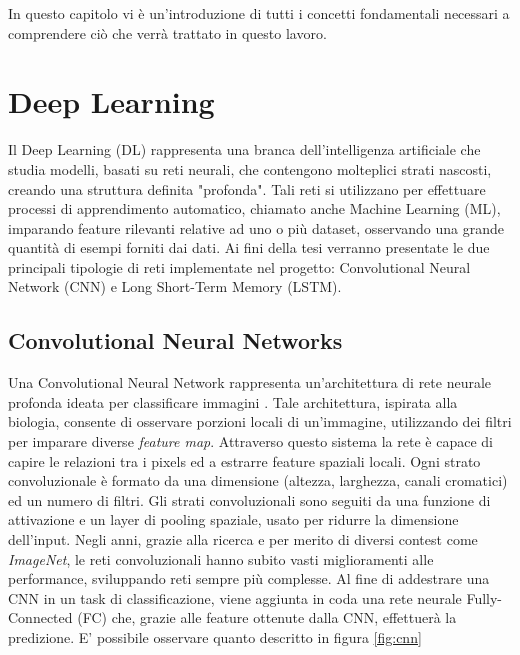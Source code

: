 \documentclass[11pt]{report}
\begin{document}
In questo capitolo vi è un'introduzione di tutti i concetti fondamentali necessari a comprendere ciò che verrà trattato in questo lavoro.


\section{Deep Learning}

Il Deep Learning (DL) rappresenta una branca dell'intelligenza artificiale che studia modelli, basati su reti neurali, che contengono molteplici strati nascosti, creando una struttura definita "profonda". Tali reti si utilizzano per effettuare processi di apprendimento automatico, chiamato anche Machine Learning (ML), imparando feature rilevanti relative ad uno o più dataset, osservando una grande quantità di esempi forniti dai dati. Ai fini della tesi verranno presentate le due principali tipologie di reti implementate nel progetto: Convolutional Neural Network (CNN) e Long Short-Term Memory (LSTM).


\subsection{Convolutional Neural Networks}
Una Convolutional Neural Network rappresenta un'architettura di rete neurale profonda ideata per classificare immagini \cite{krizhevsky2012imagenet}. Tale architettura, ispirata alla biologia, consente di osservare porzioni locali di un'immagine, utilizzando dei filtri per imparare diverse \textit{feature map}. Attraverso questo sistema la rete è capace di capire le relazioni tra i pixels ed a estrarre feature spaziali locali. Ogni strato convoluzionale è formato da una dimensione (altezza, larghezza, canali cromatici) ed un numero di filtri. Gli strati convoluzionali sono seguiti da una funzione di attivazione e un layer di pooling spaziale, usato per ridurre la dimensione dell'input. Negli anni, grazie alla ricerca e per merito di diversi contest come \textit{ImageNet}, le reti convoluzionali hanno subito vasti miglioramenti alle performance, sviluppando reti sempre più complesse. Al fine di addestrare una CNN in un task di classificazione, viene aggiunta in coda una rete neurale Fully-Connected (FC) che, grazie alle feature ottenute dalla CNN, effettuerà la predizione.  E' possibile osservare quanto descritto in figura \ref{fig:cnn}
\end{document}
